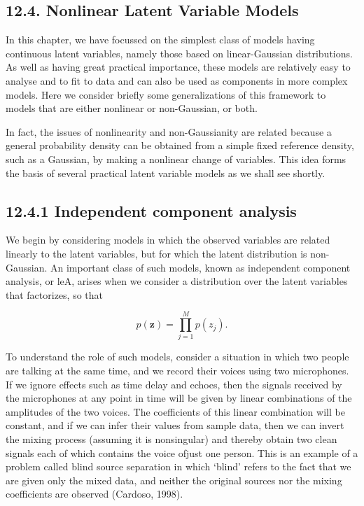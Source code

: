 \documentclass[
  10
]{article}
\begin{document}
\subsection{12.4. Nonlinear Latent Variable
Models}\label{nonlinear-latent-variable-models}

In this chapter, we have focussed on the simplest class of models having
continuous latent variables, namely those based on linear-Gaussian
distributions. As well as having great practical importance, these
models are relatively easy to analyse and to fit to data and can also be
used as components in more complex models. Here we consider briefly some
generalizations of this framework to models that are either nonlinear or
non-Gaussian, or both.

In fact, the issues of nonlinearity and non-Gaussianity are related
because a general probability density can be obtained from a simple
fixed reference density, such as a Gaussian, by making a nonlinear
change of variables. This idea forms the basis of several practical
latent variable models as we shall see shortly.

\subsection{12.4.1 Independent component
analysis}\label{independent-component-analysis}

We begin by considering models in which the observed variables are
related linearly to the latent variables, but for which the latent
distribution is non-Gaussian. An important class of such models, known
as independent component analysis, or leA, arises when we consider a
distribution over the latent variables that factorizes, so that

\[
p (\mathbf {z}) = \prod_ {j = 1} ^ {M} p (z _ {j}).\tag{12.89}
\]

To understand the role of such models, consider a situation in which two
people are talking at the same time, and we record their voices using
two microphones. If we ignore effects such as time delay and echoes,
then the signals received by the microphones at any point in time will
be given by linear combinations of the amplitudes of the two voices. The
coefficients of this linear combination will be constant, and if we can
infer their values from sample data, then we can invert the mixing
process (assuming it is nonsingular) and thereby obtain two clean
signals each of which contains the voice ofjust one person. This is an
example of a problem called blind source separation in which `blind'
refers to the fact that we are given only the mixed data, and neither
the original sources nor the mixing coefficients are observed (Cardoso,
1998).
\end{document}

